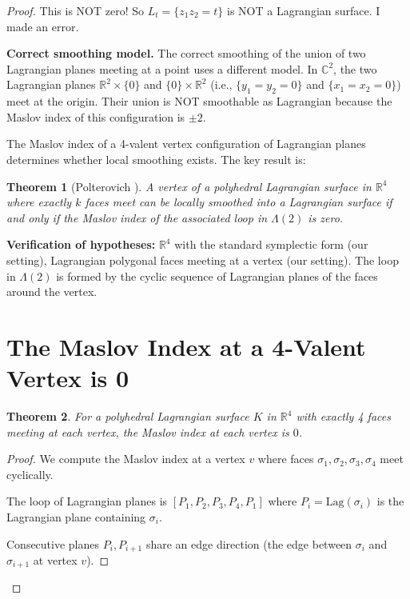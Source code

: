 \documentclass[12pt]{article}
\newtheorem{theorem}{Theorem}
\begin{document}
\begin{proof}
This is NOT zero! So $L_t = \{z_1z_2 = t\}$ is NOT a Lagrangian surface. I made an error.

\textbf{Correct smoothing model.} The correct smoothing of the union of two Lagrangian planes meeting at a point uses a different model. In $\mathbb{C}^2$, the two Lagrangian planes $\mathbb{R}^2 \times \{0\}$ and $\{0\} \times \mathbb{R}^2$ (i.e., $\{y_1 = y_2 = 0\}$ and $\{x_1 = x_2 = 0\}$) meet at the origin. Their union is NOT smoothable as Lagrangian because the Maslov index of this configuration is $\pm 2$.

The Maslov index of a 4-valent vertex configuration of Lagrangian planes determines whether local smoothing exists. The key result is:

\begin{theorem}[Polterovich \cite{Polterovich1991}]\label{thm:polterovich}
A vertex of a polyhedral Lagrangian surface in $\mathbb{R}^4$ where exactly $k$ faces meet can be locally smoothed into a Lagrangian surface if and only if the Maslov index of the associated loop in $\Lambda(2)$ is zero.
\end{theorem}

\textbf{Verification of hypotheses:} $\mathbb{R}^4$ with the standard symplectic form (our setting), Lagrangian polygonal faces meeting at a vertex (our setting). The loop in $\Lambda(2)$ is formed by the cyclic sequence of Lagrangian planes of the faces around the vertex.

\section{The Maslov Index at a 4-Valent Vertex is 0}

\begin{theorem}\label{thm:maslov-zero}
For a polyhedral Lagrangian surface $K$ in $\mathbb{R}^4$ with exactly 4 faces meeting at each vertex, the Maslov index at each vertex is $0$.
\end{theorem}

\begin{proof}
We compute the Maslov index at a vertex $v$ where faces $\sigma_1, \sigma_2, \sigma_3, \sigma_4$ meet cyclically.

The loop of Lagrangian planes is $[P_1, P_2, P_3, P_4, P_1]$ where $P_i = \mathrm{Lag}(\sigma_i)$ is the Lagrangian plane containing $\sigma_i$.

Consecutive planes $P_i, P_{i+1}$ share an edge direction (the edge between $\sigma_i$ and $\sigma_{i+1}$ at vertex $v$).


\end{proof}
\end{proof}
\end{document}
